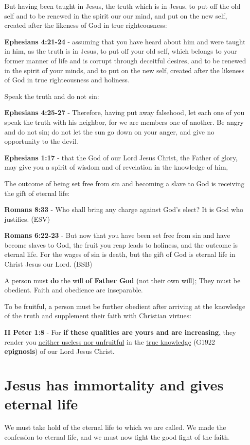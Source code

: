 \documentclass[11pt]{article}
\begin{document}
But having been taught in Jesus, the truth which is in Jesus, to put off the old self and to be renewed in the spirit our our mind, and put on the new self, created after the likeness of God in true righteousness:

\textbf{Ephesians 4:21-24} - assuming that you have heard about him and were taught in him, as the truth is in Jesus, to put off your old self, which belongs to your former manner of life and is corrupt through deceitful desires, and to be renewed in the spirit of your minds, and to put on the new self, created after the likeness of God in true righteousness and holiness.

Speak the truth and do not sin:

\textbf{Ephesians 4:25-27} - Therefore, having put away falsehood, let each one of you speak the truth with his neighbor, for we are members one of another. Be angry and do not sin; do not let the sun go down on your anger, and give no opportunity to the devil.

\textbf{Ephesians 1:17} - that the God of our Lord Jesus Christ, the Father of glory, may give you a spirit of wisdom and of revelation in the knowledge of him,

The outcome of being set free from sin and becoming a slave to God is receiving the gift of eternal life:

\textbf{Romans 8:33} -  Who shall bring any charge against God's elect?  It is God who justifies.  (ESV)

\textbf{Romans 6:22-23} - But now that you have been set free from sin and have become slaves to God, the fruit you reap leads to holiness, and the outcome is eternal life. For the wages of sin is death, but the gift of God is eternal life in Christ Jesus our Lord. (BSB)

A person must \textbf{do} the will \textbf{of Father God} (not their own will); They must be obedient.
Faith and obedience are inseparable.

To be fruitful, a person must be further obedient after arriving at the knowledge of the truth and supplement their faith with Christian virtues:

\textbf{II Peter 1:8} - For \textbf{if these qualities are yours and are increasing}, they render you \uline{neither useless nor unfruitful} in the \uline{true knowledge} (G1922 \textbf{epignosis}) of our Lord Jesus Christ.

\section{Jesus has immortality and gives eternal life}
\label{sec:orgff2b2e8}
We must take hold of the eternal life to which we are called.
We made the confession to eternal life, and we must now fight the good fight of the faith.
\end{document}
